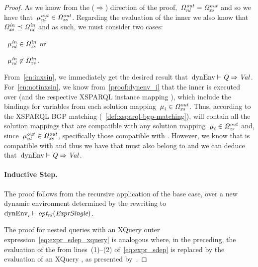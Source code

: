 \begin{proof}
  As we know from the ($\Rightarrow$) direction of the proof,~${\mathit{\Omega}}_{\mathit{nl}}^{\mathit{out}} = {\mathit{\Omega}}_{\mathit{xs}}^{\mathit{out}}$ and so we have
  that~${\mathit{\mu}}_{\mathit{nl}}^{\mathit{out}} \in {\mathit{\Omega}}_{\mathit{xs}}^{\mathit{out}}$.  Regarding the evaluation of the inner \SparqlForClause we also know
  that~${\mathit{\Omega}}_{\mathit{xs}}^{\mathit{in}} \preceq {\mathit{\Omega}}_{\mathit{nl}}^{\mathit{in}}$ and as such, we must consider two cases:
  \begin{inparaenum}[(i)]
  \item\label{en:inxsin}~${\mathit{\mu}}_{\mathit{nl}}^{\mathit{in}} \in {\mathit{\Omega}}_{\mathit{xs}}^{\mathit{in}}$ or
  \item\label{en:notinxsin}~${\mathit{\mu}}_{\mathit{nl}}^{\mathit{in}} \not\in {\mathit{\Omega}}_{\mathit{xs}}^{\mathit{in}}$.
  \end{inparaenum}
  From~\eqref{en:inxsin}, we immediately get the desired result that~${\textrm{dynEnv}} \vdash \mathit{{Q}_{}} \Rightarrow
  \mathit{{Val}_{}}$.
  For~\eqref{en:notinxsin}, we know from~\eqref{proof:dynenv_i} that the inner \SparqlForClause is executed over
   (and the respective XSPARQL instance mapping ), which include the bindings for variables from
  each solution mapping~${\mathit{\mu}}_{\mathit{i}}^{\mathit{}} \in {\mathit{\Omega}}_{\mathit{xs}}^{\mathit{out}}$.
  Thus, according to the XSPARQL \ac{BGP} matching (\cf~\cref{def:xsparql-bgp-matching}),  will
  contain all the solution mappings that are compatible with any solution mapping~${\mathit{\mu}}_{\mathit{i}}^{\mathit{}} \in {\mathit{\Omega}}_{\mathit{xs}}^{\mathit{out}}$ and,
  since~${\mathit{\mu}}_{\mathit{nl}}^{\mathit{out}} \in {\mathit{\Omega}}_{\mathit{xs}}^{\mathit{out}}$, specifically those compatible with .  
  However, we know that  is compatible with  and thus we have that  must also belong
  to  and we can deduce that~${\textrm{dynEnv}} \vdash \mathit{{Q}_{}} \Rightarrow \mathit{{Val}_{}}$.

  \paragraph*{Inductive Step.}
  The proof follows from the recursive application of the base case, over a new dynamic environment determined by the
   rewriting to $\mathrm{dynEnv}_{i}^{\mathit{}} \vdash \mathit{opt_{nl}}\!\left({\textit{Expr\-Single}}\right)$.

  \medskip

  The proof for nested queries with an XQuery \FOR outer expression~\eqref{eq:expr_sdep_xquery} is analogous where, in
  the preceding, the evaluation of the \SparqlForClause from lines~(1)--(2) of~\eqref{eq:expr_sdep} is replaced by the
  evaluation of an XQuery \ForClause, as presented by~\cite[Section~4.8.2]{DraperFankhauserFernandez:2010aa}.
\end{proof}


